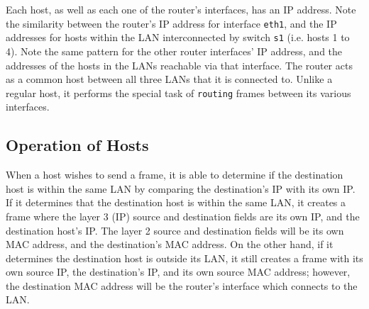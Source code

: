 \documentclass[11pt]{article}
\begin{document}
Each host, as well as each one of the router's interfaces, has an IP address.
Note the similarity between the router's IP address for interface \texttt{eth1}, and the IP addresses for hosts within the LAN interconnected by switch \texttt{s1} (i.e. hosts 1 to 4).
Note the same pattern for the other router interfaces' IP address, and the addresses of the hosts in the LANs reachable via that interface.
The router acts as a common host between all three LANs that it is connected to. Unlike a regular host, it performs the special task of \texttt{routing} frames between its various interfaces.


\subsection{Operation of Hosts}
\label{subsec:logic-hosts}
When a host wishes to send a frame, it is able to determine if the destination host is within the same LAN by comparing the destination's IP with its own IP.
If it determines that the destination host is within the same LAN, it creates a frame where the layer 3 (IP) source and destination fields are its own IP, and the destination host's IP. The layer 2 source and destination fields will be its own MAC address, and the destination's MAC address.
On the other hand, if it determines the destination host is outside its LAN, it still creates a frame with its own source IP, the destination's IP, and its own source MAC address; however, the destination MAC address will be the router's interface which connects to the LAN.



\end{document}
